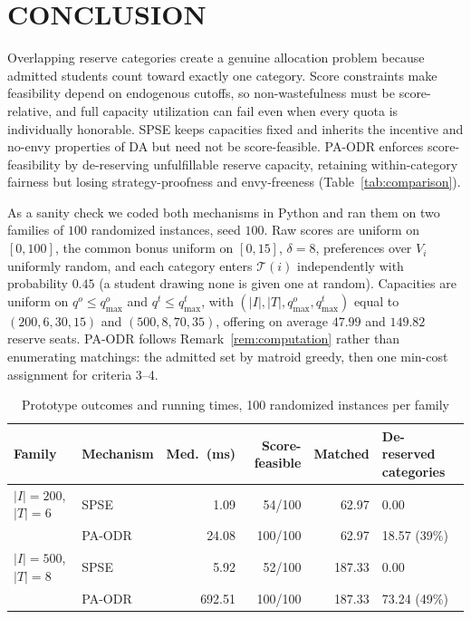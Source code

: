 \documentclass[a4paper,twoside]{article}
\theoremstyle{definition}
\renewcommand{\T}{\mathcal{T}}
\begin{document}

\section{\uppercase{Conclusion}}

Overlapping reserve categories create a genuine allocation problem because admitted students count toward exactly one category. Score constraints make feasibility depend on endogenous cutoffs, so non-wastefulness must be score-relative, and full capacity utilization can fail even when every quota is individually honorable. SPSE keeps capacities fixed and inherits the incentive and no-envy properties of DA but need not be score-feasible. PA-ODR enforces score-feasibility by de-reserving unfulfillable reserve capacity, retaining within-category fairness but losing strategy-proofness and envy-freeness (Table~\ref{tab:comparison}).

As a sanity check we coded both mechanisms in Python and ran them on two families of $100$ randomized instances, seed $100$. Raw scores are uniform on $[0,100]$, the common bonus uniform on $[0,15]$, $\delta=8$, preferences over $V_i$ uniformly random, and each category enters $\T(i)$ independently with probability $0.45$ (a student drawing none is given one at random). Capacities are uniform on $q^o\le q^o_{\max}$ and $q^t\le q^t_{\max}$, with $(|I|,|T|,q^o_{\max},q^t_{\max})$ equal to $(200,6,30,15)$ and $(500,8,70,35)$, offering on average $47.99$ and $149.82$ reserve seats. PA-ODR follows Remark~\ref{rem:computation} rather than enumerating matchings: the admitted set by matroid greedy, then one min-cost assignment for criteria 3--4.

\begin{table}[t]
\centering
\caption{Prototype outcomes and running times, 100 randomized instances per family}
\label{tab:prototype-time}
\small
\begin{tabular}{|L{0.22\textwidth}|L{0.18\textwidth}|r|r|r|L{0.18\textwidth}|}
\hline
Family & Mechanism & Med.\ (ms) & Score-feasible & Matched & De-reserved categories \\
\hline
$|I|=200$, $|T|=6$ & SPSE & 1.09 & 54/100 & 62.97 & 0.00 \\
 & PA-ODR & 24.08 & 100/100 & 62.97 & 18.57 (39\%) \\
\hline
$|I|=500$, $|T|=8$ & SPSE & 5.92 & 52/100 & 187.33 & 0.00 \\
 & PA-ODR & 692.51 & 100/100 & 187.33 & 73.24 (49\%) \\
\hline
\end{tabular}
\end{table}
\end{document}
